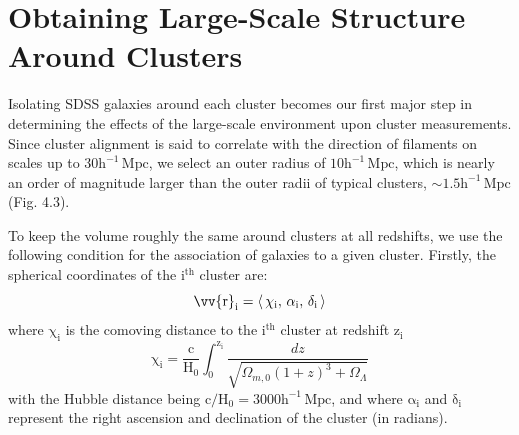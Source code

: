 \section[Galaxies Around Clusters]{Obtaining Large-Scale Structure Around Clusters}
Isolating SDSS galaxies around each cluster becomes our first major step in
determining the effects of the large-scale environment upon cluster
measurements. Since cluster alignment is said to correlate with the direction
of filaments on scales up to $\mathrm{30 h^{-1} \, Mpc}$, we select an outer
radius of $\mathrm{10 h^{-1} \, Mpc}$, which is nearly an order of
magnitude larger than the outer radii of typical clusters, $\mathrm{\sim 1.5
  h^{-1} \, Mpc}$ (Fig. 4.3).

To keep the volume roughly the same around clusters at all redshifts, we use
the following condition for the association of galaxies to a given
cluster. Firstly, the spherical coordinates of the $\mathrm{i^{th}}$ cluster
are:
\begin{equation}
\mathrm{{\vv{r}}_{i} = \langle\, \chi_{i},\, \alpha_{i},\, \delta_{i}\, \rangle}
\end{equation}
where $\mathrm{\chi_{i}}$ is the comoving distance to the $\mathrm{i^{th}}$
cluster at redshift $\mathrm{z_{i}}$
\begin{equation}
\mathrm{\chi_{i} = \frac{c}{H_{0}} \int_{0}^{z_{i}}}
\frac{dz}{\sqrt{\Omega_{m,0}(1+z)^{3} + \Omega_{\Lambda}}}
\end{equation}
with the Hubble distance being $\mathrm{c/H_{0} = 3000 h^{-1}\, Mpc}$, and
where $\mathrm{\alpha_{i}}$ and $\mathrm{\delta_{i}}$ represent the right
ascension and declination of the cluster (in radians).

